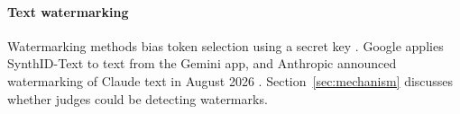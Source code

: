 \paragraph{Text watermarking}
Watermarking methods bias token selection using a secret key
\citep{kirchenbauer2023watermark, dathathri2024synthid}. Google applies
SynthID-Text to text from the Gemini app, and Anthropic announced watermarking
of Claude text in August 2026 \citep{anthropic2026watermark}. Section~\ref{sec:mechanism}
discusses whether judges could be detecting watermarks.
